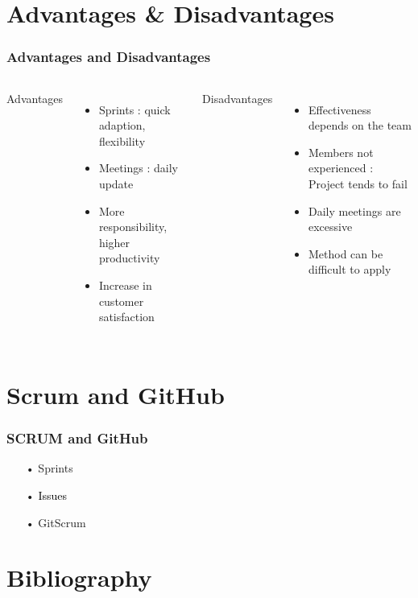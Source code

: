 \documentclass{beamer}
\begin{document}
\section{Advantages \& Disadvantages}

\begin{frame}
    \frametitle{Advantages and Disadvantages}
    
    \begin{columns}
    
    Advantages
    \begin{itemize} 
    \item<2-> Sprints : quick adaption, flexibility
    \item<3-> Meetings : daily update
    \item<4-> More responsibility, higher productivity
    \item<5-> Increase in customer satisfaction
    \end{itemize}
    
    Disadvantages
    \begin{itemize}
    \item<6-> Effectiveness depends on the team
    \item<7-> Members not experienced : Project tends to fail
    \item<8-> Daily meetings are excessive
    \item<9-> Method can be difficult to apply
    \end{itemize}
    \end{columns}
\end{frame}



\section{Scrum and GitHub}

\begin{frame}
    \frametitle{SCRUM and GitHub}
    \begin{itemize}
    \color{gray}
    \item[•] Sprints
    \item[•] \textcolor{black}{Issues}
    \item[•] GitScrum
    \end{itemize}
\end{frame}



\section{Bibliography}
\end{document}
